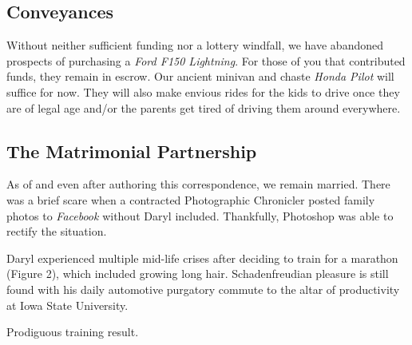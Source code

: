 \documentclass[letterpaper,11pt]{article}
\makeatletter
\newenvironment{figurehere}
  {\def\@captype{figure}}
  {}
\makeatother
\begin{document}
\begin{multicols}{2}
\subsection{Conveyances}

Without neither sufficient funding nor a lottery windfall, we have abandoned prospects of purchasing a
\textit{Ford F150 Lightning}.  For those of you that contributed funds,
they remain in escrow. Our ancient minivan and chaste \textit{Honda Pilot}
will suffice for now. They will also make envious rides for the kids to drive once
they are of legal age and/or the parents get tired of driving them around everywhere.

\bigskip

\subsection{The Matrimonial Partnership}

As of and even after authoring this correspondence, we remain married.  There was a brief scare when a contracted 
Photographic Chronicler posted family photos to \textit{Facebook} without Daryl
included.  Thankfully, Photoshop was able to rectify the situation.

Daryl experienced multiple mid-life crises after deciding to train
for a marathon (Figure 2), which included growing long hair.
Schadenfreudian pleasure is still found with his daily automotive purgatory commute
to the altar of productivity at Iowa State University.

\begin{figurehere}
    \centering   
    \caption{Prodiguous training result.}
\end{figurehere}


\end{multicols}
\end{document}
